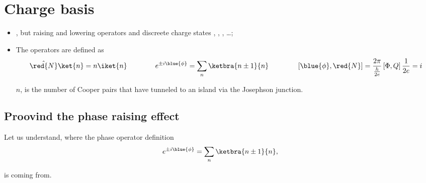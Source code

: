 \section{Charge basis\label{sec:charge_basis}}
 
 \begin{itemize}
 	\item {}, but raising and lowering operators and discreete charge states , , ,  \ldots;
 	\item The operators are defined as
 	\begin{equation}\label{key}
 		\hat{\red{N}}\ket{n} = n\iket{n}\qquad\qquad e^{\pm i\blue{\phi}} = \sum_n\ketbra{n\pm 1}{n} \qquad\qquad \left[\blue{\phi},\red{N}\right] = \frac{2\pi}{\frac{h}{2e}}\left[\Phi,Q\right]\frac{1}{2e} = i
	\end{equation}
 
 \noindent $ n $, is the number of Cooper pairs that have tunneled to an island via the Josephson junction.
 \end{itemize}

\subsection{Proovind the phase raising effect}
 Let us understand, where the phase operator definition
 \begin{equation}\label{key}
 	e^{\pm i\blue{\phi}} = \sum_n\ketbra{n\pm 1}{n},
 \end{equation}
 
 \noindent is coming from. 
 
